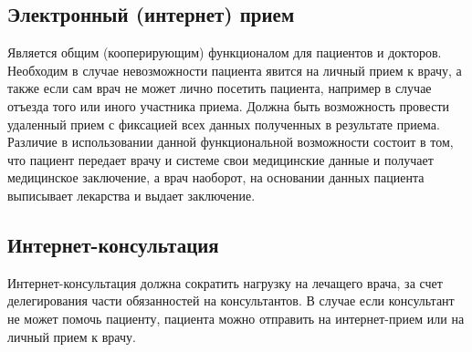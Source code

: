 \subsection{Электронный (интернет) прием}
Является общим (кооперирующим) функционалом для пациентов и докторов. Необходим
в случае невозможности пациента явится на личный прием к врачу, а также если сам
врач не может лично посетить пациента, например в случае отъезда того или иного
участника приема. Должна быть возможность провести удаленный прием с фиксацией
всех данных полученных в результате приема. Различие в использовании данной
функциональной возможности состоит в том, что пациент передает врачу и системе
свои медицинские данные и получает медицинское заключение, а врач наоборот, на
основании данных пациента выписывает лекарства и выдает заключение.

\subsection{Интернет-консультация}
Интернет-консультация должна сократить нагрузку на лечащего врача, за счет
делегирования части обязанностей на консультантов. В случае если консультант не
может помочь пациенту, пациента можно отправить на интернет-прием или на личный
прием к врачу.
